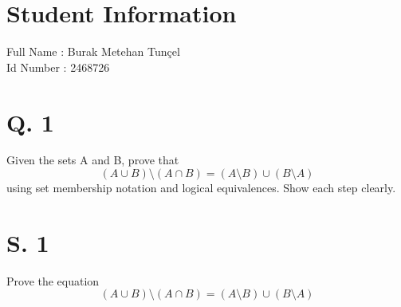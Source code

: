\documentclass[11pt]{article}
\begin{document}
\section*{Student Information } 
Full Name :  Burak Metehan Tunçel \\
Id Number :  2468726 \\

\section*{Q. 1}
Given the sets A and B, prove that
\begin{equation*}
    (A \cup B) \setminus (A \cap B) = (A \setminus B) \cup (B \setminus A)
\end{equation*}
using set membership notation and logical equivalences. Show each step clearly.

\section*{S. 1}
Prove the equation
\begin{equation*}
    (A \cup B) \setminus (A \cap B) = (A \setminus B) \cup (B \setminus A)
\end{equation*}
\end{document}
